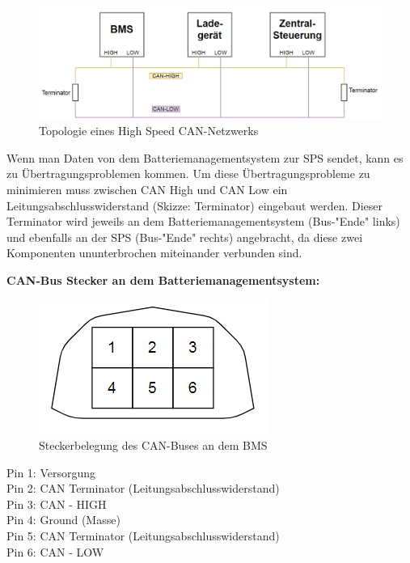 \begin{figure}[H]
	\begin{center}
		\includegraphics[scale=0.7]{figures/Akku/TopologieCAN-Netzwerks.PNG}
		\caption{Topologie eines High Speed CAN-Netzwerks}
		\label{fig: Topologie eines High Speed CAN-Netzwerks}
	\end{center}
\end{figure}

Wenn man Daten von dem Batteriemanagementsystem zur SPS sendet, kann es zu Übertragungsproblemen kommen. Um diese Übertragungsprobleme zu minimieren muss zwischen CAN High und CAN Low ein Leitungsabschlusswiderstand (Skizze: Terminator) eingebaut werden. Dieser Terminator wird jeweils an dem Batteriemanagementsystem (Bus-"Ende" links) und ebenfalls an der SPS (Bus-"Ende" rechts) angebracht, da diese zwei Komponenten ununterbrochen miteinander verbunden sind. 

\textbf{CAN-Bus Stecker an dem Batteriemanagementsystem:}

\begin{figure}[H]
	\begin{center}
		\includegraphics[scale=0.7]{figures/Akku/CANStecker.PNG}
		\caption{Steckerbelegung des CAN-Buses an dem BMS}
		\label{fig: Steckerbelegung des CAN-Buses an dem BMS}
	\end{center}
\end{figure}

Pin 1: Versorgung\\
Pin 2: CAN Terminator (Leitungsabschlusswiderstand)\\
Pin 3: CAN - HIGH\\
Pin 4: Ground (Masse)\\
Pin 5: CAN Terminator (Leitungsabschlusswiderstand)\\
Pin 6: CAN - LOW\\
\newpage


